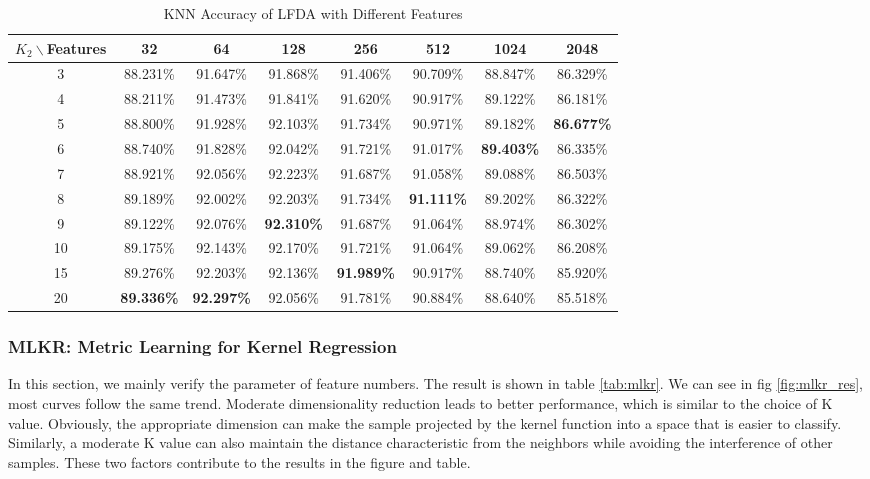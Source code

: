 \begin{table}[htbp]
    \centering
    \caption{KNN Accuracy of LFDA with Different Features}
    \begin{tabular}{@{}cccccccc@{}}
    \toprule
    $K_2 \backslash $Features & 32 & 64 & 128 & 256 & 512 & 1024 & 2048 \\ \midrule
    3 & 88.231\% & 91.647\% & 91.868\% & 91.406\% & 90.709\% & 88.847\% & 86.329\% \\
    4 & 88.211\% & 91.473\% & 91.841\% & 91.620\% & 90.917\% & 89.122\% & 86.181\% \\
    5 & 88.800\% & 91.928\% & 92.103\% & 91.734\% & 90.971\% & 89.182\% & \textbf{86.677\%} \\
    6 & 88.740\% & 91.828\% & 92.042\% & 91.721\% & 91.017\% & \textbf{89.403\%} & 86.335\% \\
    7 & 88.921\% & 92.056\% & 92.223\% & 91.687\% & 91.058\% & 89.088\% & 86.503\% \\
    8 & 89.189\% & 92.002\% & 92.203\% & 91.734\% & \textbf{91.111\%} & 89.202\% & 86.322\% \\
    9 & 89.122\% & 92.076\% & \textbf{92.310\%} & 91.687\% & 91.064\% & 88.974\% & 86.302\% \\
    10 & 89.175\% & 92.143\% & 92.170\% & 91.721\% & 91.064\% & 89.062\% & 86.208\% \\
    15 & 89.276\% & 92.203\% & 92.136\% & \textbf{91.989\%} & 90.917\% & 88.740\% & 85.920\% \\
    20 & \textbf{89.336\%} & \textbf{92.297\%} & 92.056\% & 91.781\% & 90.884\% & 88.640\% & 85.518\% \\
    \bottomrule
    \end{tabular}
    \label{tab:lfda}
\end{table}
    


\subsubsection{MLKR: Metric Learning for Kernel Regression}
        In this section, we mainly verify the parameter of feature numbers. The result is shown in table \ref{tab:mlkr}.  We can see in fig \ref{fig:mlkr_res}, most curves follow the same trend. Moderate dimensionality reduction leads to better performance, which is similar to the choice of K value. Obviously, the appropriate dimension can make the sample projected by the kernel function into a space that is easier to classify. Similarly, a moderate K value can also maintain the distance characteristic from the neighbors while avoiding the interference of other samples. These two factors contribute to the results in the figure and table.

